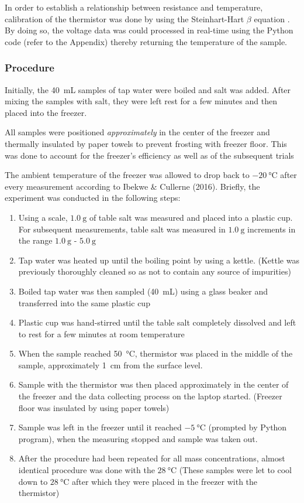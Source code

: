 \documentclass[../main.tex]{subfiles}
\begin{document}
In order to establish a relationship between resistance and temperature, calibration of the thermistor was done by using the Steinhart-Hart $\beta$ equation \autocite{steinhart_calibration_1968}. By doing so, the voltage data was could processed in real-time using the Python code (refer to the Appendix) thereby returning the temperature of the sample. \par

\subsubsection{Procedure}
Initially, the \SI{40}{\milli\liter} samples of tap water were boiled and salt was added. After mixing the samples with salt, they were left rest for a few minutes and then placed into the freezer.

All samples were positioned \emph{approximately} in the center of the freezer and thermally insulated by paper towels to prevent frosting with freezer floor. This was done to account for the freezer's efficiency as well as  of the subsequent trials

The ambient temperature of the freezer was allowed to drop back to $\SI{-20}{\celsius}$ after every measurement according to Ibekwe \& Cullerne (2016). Briefly, the experiment was conducted in the following steps:

\begin{enumerate}
    \item Using a scale, $\SI{1.0}{\gram}$ of table salt was measured and placed into a plastic cup. For subsequent measurements, table salt was measured in $\SI{1.0}{\gram}$ increments in the range $\SI{1.0}{\gram}$ - $\SI{5.0}{\gram}$
    \item Tap water was heated up until the boiling point by using a kettle. (Kettle was previously thoroughly cleaned so as not to contain any source of impurities) 
    \item Boiled tap water was then sampled (\SI{40}{\milli\liter}) using a glass beaker and transferred into the same plastic cup
    \item Plastic cup was hand-stirred until the table salt completely dissolved and left to rest for a few minutes at room temperature
    \item When the sample reached \SI{50}{\celsius}, thermistor was placed in the middle of the sample, approximately \SI{1}{\centi\meter} from the surface level.
    \item Sample with the thermistor was then placed approximately in the center of the freezer and the data collecting process on the laptop started. (Freezer floor was insulated by using paper towels)
    \item Sample was left in the freezer until it reached $\SI{-5}{\celsius}$ (prompted by Python program), when the measuring stopped and sample was taken out.
    \item After the procedure had been repeated for all mass concentrations, almost identical procedure was done with the $\SI{28}{\celsius}$ (These samples were let to cool down to $\SI{28}{\celsius}$ after which they were placed in the freezer with the thermistor) 
\end{enumerate}
\end{document}
